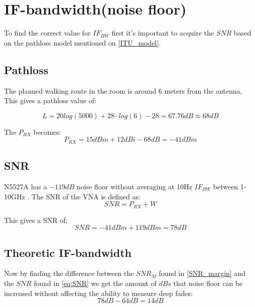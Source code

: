 


\section{IF-bandwidth(noise floor)}
To find the correct value for $IF_{BW}$ first it's important to acquire the $SNR$ based on the pathloss model mentioned on \autoref{ITU_model}.
\subsection{Pathloss}
The planned walking route in the room is around 6 meters from the antenna. This gives a pathloss value of:


\begin{equation}
L = 20log (5000) + 28 \cdot log(6)-28 = 67.76dB \approx 68dB
\label{eq:path_loss}
\end{equation}

The $P_{RX}$ becomes:
\begin{equation}
P_{RX} = 15dBm + 12dBi - 68dB = -41dBm
\label{NFvna}
\end{equation}

\subsection{SNR}
N5527A has a $-119dB$ noise floor without averaging at 10Hz $IF_{BW}$ between 1-10GHz \citep{Key_PNA}. The \gls{SNR} of the VNA  is defined as:
\begin{equation}
SNR = P_{RX}+W
\end{equation}

\begin{where}
\end{where}

This gives a SNR of:
\begin{equation}
SNR = -41dBm+119dBm = 78dB
\label{eq:SNR}
\end{equation}

\subsection{Theoretic IF-bandwidth}
Now by finding the difference between the $SNR_{M}$ found in \autoref{SNR_margin} and the $SNR$ found in \autoref{eq:SNR} we get the amount of $dBs$ that noise floor can be increased without affecting the ability to measure deep fades:
\begin{equation}
  78dB-64dB = 14dB 
\end{equation}

